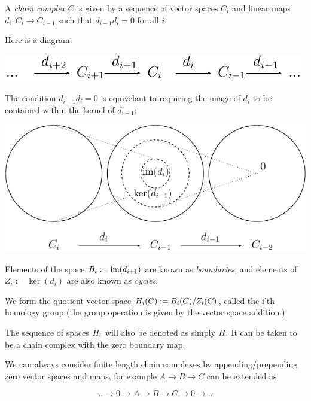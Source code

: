 A {\it chain complex} $C$ is given by a sequence of vector spaces
${C_i}$ and linear maps $d_i:C_i\to C_{i-1}$ such that $d_{i-1}d_i=0$
for all $i$.

Here is a diagram:

\begin{center}
\includegraphics{chain.pdf}
\end{center}

The condition $d_{i-1}d_i=0$ is equivelant to
requiring the image of $d_i$ to be contained within the kernel of $d_{i-1}$:

\begin{center}
\includegraphics{figure_02.pdf}
\end{center}

Elements of the space $ B_i := \text{im}(d_{i+1}) $ are known as {\it boundaries},
and elements of $ Z_i := \ker(d_i) $ are also known as {\it cycles}.

We form the quotient vector space
$H_i(C) := B_i(C) / Z_i(C)$,
called the i'th homology 
group (the group operation is given by the vector space addition.)

The sequence of spaces ${H_i}$ will also be denoted as
simply $H.$ It can be taken to be a chain
complex with the zero boundary map.

We can always consider finite length chain complexes
by appending/prepending zero vector spaces and maps,
for example $A \to B \to C$ can be extended as

    $$ ... \to 0 \to A \to B \to C \to 0 \to ... $$


